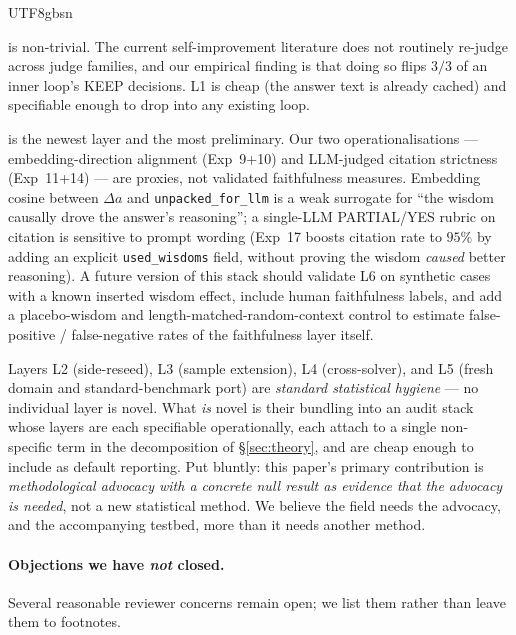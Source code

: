 \documentclass{article}
\begin{document}
\begin{CJK*}{UTF8}{gbsn}
\begin{description}[leftmargin=1.5em,topsep=2pt,itemsep=2pt]
  \item[\textbf{L1 (cross-family re-judgment)}]
    is non-trivial. The current self-improvement literature does
    not routinely re-judge across judge families, and our empirical
    finding is that doing so flips \(3/3\) of an inner loop's KEEP
    decisions. L1 is cheap (the answer text is already cached) and
    specifiable enough to drop into any existing loop.
  \item[\textbf{L6 (faithfulness via non-pair-wr axes)}]
    is the newest layer and the most preliminary. Our two
    operationalisations --- embedding-direction alignment
    (Exp~9+10) and LLM-judged citation strictness (Exp~11+14) ---
    are proxies, not validated faithfulness measures. Embedding
    cosine between \(\Delta a\) and \texttt{unpacked\_for\_llm} is
    a weak surrogate for ``the wisdom causally drove the answer's
    reasoning''; a single-LLM PARTIAL/YES rubric on citation is
    sensitive to prompt wording (Exp~17 boosts citation rate to
    \(95\%\) by adding an explicit \texttt{used\_wisdoms} field,
    without proving the wisdom \emph{caused} better reasoning).
    A future version of this stack should validate L6 on
    synthetic cases with a known inserted wisdom effect, include
    human faithfulness labels, and add a placebo-wisdom and
    length-matched-random-context control to estimate
    false-positive / false-negative rates of the faithfulness
    layer itself.
\end{description}

\noindent Layers L2 (side-reseed), L3 (sample extension), L4
(cross-solver), and L5 (fresh domain and standard-benchmark port)
are \emph{standard statistical hygiene} — no individual layer is
novel. What \emph{is} novel is their bundling into an audit stack
whose layers are each specifiable operationally, each attach to a
single non-specific term in the decomposition of
\S\ref{sec:theory}, and are cheap enough to include as default
reporting. Put bluntly: this paper's primary contribution is
\emph{methodological advocacy with a concrete null result as
evidence that the advocacy is needed}, not a new statistical
method. We believe the field needs the advocacy, and the
accompanying testbed, more than it needs another method.

\paragraph{Objections we have \emph{not} closed.} Several
reasonable reviewer concerns remain open; we list them rather
than leave them to footnotes.


\end{CJK*}
\end{document}
